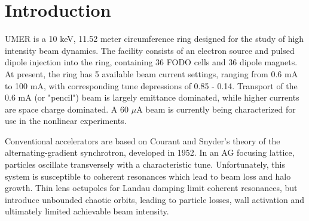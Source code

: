 
\renewcommand{\thechapter}{1}

\chapter{Introduction}



UMER is a 10 keV, 11.52 meter circumference ring designed for the study of high intensity beam dynamics. The facility consists of an electron source and pulsed dipole injection into the ring, containing 36 FODO cells and 36 dipole magnets. At present, the ring has 5 available beam current settings, ranging from 0.6 mA to 100 mA, with corresponding tune depressions of 0.85 - 0.14.  Transport of the 0.6 mA (or "pencil") beam is largely emittance dominated, while higher currents are space charge dominated. A 60 $\mu$A beam is currently being characterized for use in the nonlinear experiments.


Conventional accelerators are based on Courant and Snyder’s theory of the alternating-gradient synchrotron, developed in 1952.\cite{Courant} 
In an AG focusing lattice, particles oscillate transversely with a characteristic tune. Unfortunately, this system is susceptible to coherent resonances which lead to beam loss and halo growth. 
Thin lens octupoles for Landau damping limit coherent resonances, but introduce unbounded chaotic orbits, leading to particle losses, wall activation and ultimately limited achievable beam intensity.



